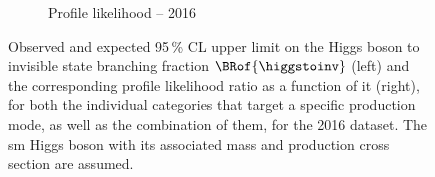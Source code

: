 \begin{figure}[htbp]
\begin{subfigure}[t]{0.45\textwidth}
        \caption{Profile likelihood -- 2016}
    \end{subfigure}
    \caption[Observed and expected 95\,\% CL upper limit on the Higgs boson to invisible state branching fraction $\BRof{\higgstoinv}$ and the corresponding profile likelihood ratio as a function of it, for both the individual categories that target a specific production mode, as well as the combination of them, for the 2016 dataset]{Observed and expected 95\,\% CL upper limit on the Higgs boson to invisible state branching fraction $\BRof{\higgstoinv}$ (left) and the corresponding profile likelihood ratio as a function of it (right), for both the individual categories that target a specific production mode, as well as the combination of them, for the 2016 dataset. The \acrlong{sm} Higgs boson with its associated mass and production cross section are assumed.}
    \label{fig:htoinv_limit_likelihood_2016}
\end{figure}

